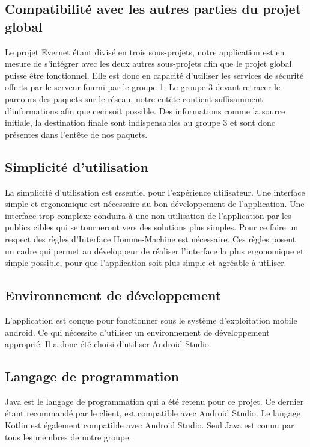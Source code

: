         
        \subsection{Compatibilité avec les autres parties du projet global}
            Le projet Evernet étant divisé en trois sous-projets, notre application est en mesure de s'intégrer avec les deux autres sous-projets afin que le projet global puisse être fonctionnel. Elle est donc en capacité d'utiliser les services de sécurité offerts par le serveur fourni par le groupe 1. Le groupe 3 devant retracer le parcours des paquets sur le réseau, notre entête contient suffisamment d'informations afin que ceci soit possible. Des informations comme la source initiale, la destination finale sont indispensables au groupe 3 et sont donc présentes dans l'entête de nos paquets.  
        
        \subsection{Simplicité d'utilisation}
            
            La simplicité d'utilisation est essentiel pour l'expérience utilisateur. Une interface simple et ergonomique est nécessaire au bon développement de l'application. Une interface trop complexe conduira à une non-utilisation de l'application par les publics cibles qui se tourneront vers des solutions plus simples. Pour ce faire un respect des règles d'Interface Homme-Machine est nécessaire. Ces règles posent un cadre qui permet au développeur de réaliser l'interface la plus ergonomique et simple possible, pour que l'application soit plus simple et agréable à utiliser.
            
              \subsection{Environnement de développement}
            L'application est conçue pour fonctionner sous le système d'exploitation mobile android. Ce qui nécessite d'utiliser un environnement de développement approprié.
            Il a donc été choisi d'utiliser Android Studio. 
            
            \subsection{Langage de programmation}
            Java est le langage de programmation qui a été retenu pour ce projet. Ce dernier étant recommandé par le client, est compatible avec Android Studio. Le langage Kotlin est également compatible avec Android Studio. Seul Java est connu par tous les membres de notre groupe.
